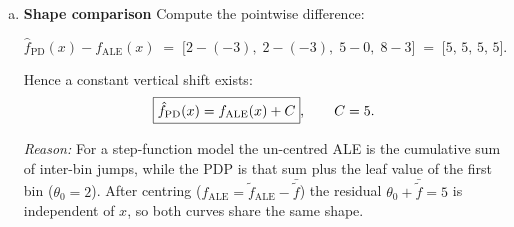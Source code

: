 {\begin{enumerate}[(a)]
\begin{enumerate}[1.]
      \item \emph{Centring}  
            Evaluate \(\widetilde f_{\mathrm{ALE}}\) at the five observations:

            \[
              \bigl(0,\;0,\;3,\;6,\;6\bigr)
              \quad\Longrightarrow\quad
              \bar{\widetilde f}=\tfrac{0+0+3+6+6}{5}=3.
            \]

            \[
              f_{\mathrm{ALE}}(x)=\widetilde f_{\mathrm{ALE}}(x)-3.
            \]

            \[
            \boxed{
            \begin{array}{c|cccc}
            x & 1.0 & 2.5 & 3.5 & 5.0 \\ \hline
            f_{\mathrm{ALE}}(x) & -3 & -3 & 0 & 3
            \end{array}}
            \]
      \end{enumerate}

\item \textbf{Shape comparison}  
      Compute the pointwise difference:

      \[
      \hat f_{\mathrm{PD}}(x)-f_{\mathrm{ALE}}(x)
      \;=\;
      \bigl[2-(-3),\;2-(-3),\;5-0,\;8-3\bigr]
      \;=\;
      \bigl[5,\,5,\,5,\,5\bigr].
      \]

      Hence a constant vertical shift exists:
      \[
        \boxed{%
        \hat f_{\mathrm{PD}}(x)=f_{\mathrm{ALE}}(x)+C},
        \qquad C=5.
      \]

      \textit{Reason:} For a step-function model the
      un-centred ALE is the cumulative sum of inter-bin jumps,
      while the PDP is that sum plus the leaf value of the first bin
      (\(\theta_0=2\)).  After centring
      (\(f_{\mathrm{ALE}}=\widetilde f_{\mathrm{ALE}}-\bar{\widetilde f}\))
      the residual \(\theta_0+\bar{\widetilde f}=5\) is independent of \(x\),
      so both curves share the same shape.
\end{enumerate}
}